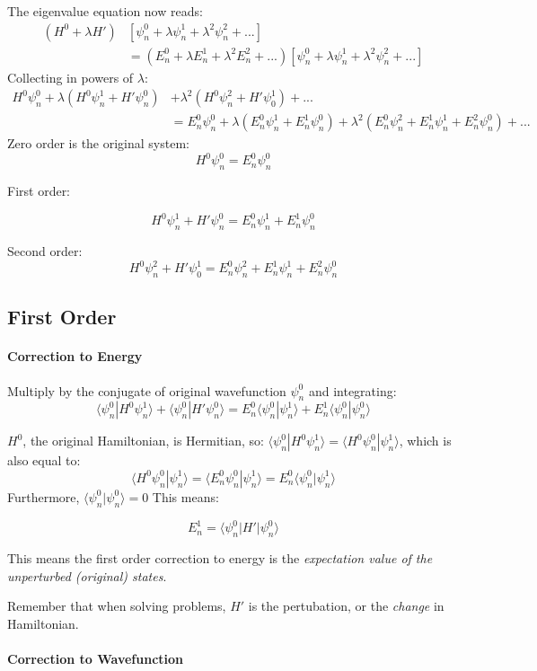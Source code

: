 \documentclass[12pt]{article}
\begin{document}
The eigenvalue equation now reads: 
\begin{align*}
    (H^0 + \lambda H') &[\psi^0_n + \lambda \psi^1_n + \lambda^2 \psi^2_n + ...]  \\&=
  (E^0_n + \lambda E^1_n + \lambda^2 E^2_n+...)[\psi^0_n + \lambda \psi^1_n + \lambda^2 \psi^2_n + ...]
\end{align*}
Collecting in powers of $\lambda$:
\begin{align*}
    H^0\psi^0_n + \lambda(H^0\psi^1_n+ H'\psi^0_n) & + \lambda^2(H^0 \psi^2_n +H'\psi^1_0) +...  \\&=
  E^0_n\psi^0_n  + \lambda(E^0_n\psi^1_n + E^1_n\psi^0_n ) +\lambda^2(E^0_n\psi^2_n + E^1_n\psi^1_n +E^2_n\psi^0_n )+...
\end{align*}
Zero order is the original system: \[H^0\psi^0_n=E^0_n\psi^0_n\]

First order:

\[H^0\psi^1_n+ H'\psi^0_n=E^0_n\psi^1_n + E^1_n\psi^0_n\]

Second order:
\[H^0 \psi^2_n +H'\psi^1_0=E^0_n\psi^2_n + E^1_n\psi^1_n +E^2_n\psi^0_n \]

\subsection{First Order}
\paragraph{Correction to Energy}
Multiply by the conjugate of original wavefunction $\psi^0_n$ and integrating:
\[\langle\psi^0_n|H^0\psi^1_n\rangle+ \langle \psi^0_n|H'\psi^0_n\rangle=E^0_n\langle\psi^0_n|\psi^1_n\rangle + E^1_n\langle\psi^0_n|\psi^0_n\rangle\]

$H^0$, the original Hamiltonian, is Hermitian, so: \(\langle\psi^0_n|H^0\psi^1_n\rangle = \langle H^0\psi^0_n|\psi^1_n\rangle\), which is also equal to:
\[\langle H^0\psi^0_n|\psi^1_n\rangle = \langle E^0_n\psi^0_n|\psi^1_n\rangle =E^0_n\langle\psi^0_n|\psi^1_n\rangle \]
Furthermore, $\langle\psi^0_n|\psi^0_n\rangle = 0$
This means:

\[\boxed{E^1_n = \langle\psi^0_n|H'|\psi^0_n\rangle}\]

This means the first order correction to energy is the \textit{expectation value of the unperturbed (original) states}.

Remember that when solving problems, $H'$ is the pertubation, or the \textit{change} in Hamiltonian.

\paragraph{Correction to Wavefunction}
\end{document}
